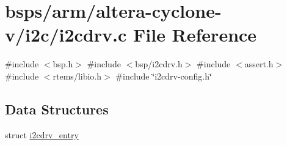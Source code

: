 \hypertarget{arm_2altera-cyclone-v_2i2c_2i2cdrv_8c}{}\section{bsps/arm/altera-\/cyclone-\/v/i2c/i2cdrv.c File Reference}
\label{arm_2altera-cyclone-v_2i2c_2i2cdrv_8c}
{\ttfamily \#include $<$bsp.\+h$>$}\newline
{\ttfamily \#include $<$bsp/i2cdrv.\+h$>$}\newline
{\ttfamily \#include $<$assert.\+h$>$}\newline
{\ttfamily \#include $<$rtems/libio.\+h$>$}\newline
{\ttfamily \#include \char`\"{}i2cdrv-\/config.\+h\char`\"{}}\newline
\subsection*{Data Structures}
\begin{DoxyCompactItemize}
\item 
struct \mbox{\hyperlink{structi2cdrv__entry}{i2cdrv\+\_\+entry}}
\end{DoxyCompactItemize}

